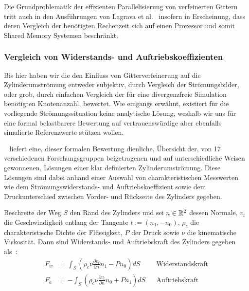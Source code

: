 \bigskip

Die Grundproblematik der effizienten Parallelisierung von verfeinerten Gittern tritt auch in den Ausführungen von Lagrava et al.~\cite[Kap.~4.1, letzter Abschnitt]{Lagrava12} insofern in Erscheinung, dass deren Vergleich der benötigten Rechenzeit sich auf einen Prozessor und somit Shared Memory Systemen beschränkt.

\newpage
\subsubsection{Vergleich von Widerstands- und Auftriebskoeffizienten}\label{kap:cylinder2dCoefficients}

Bis hier haben wir die den Einfluss von Gitterverfeinerung auf die Zylinderumströmung entweder subjektiv, durch Vergleich der Strömungsbilder, oder grob, durch einfachen Vergleich der für eine divergenzfreie Simulation benötigten Knotenanzahl, bewertet. Wie eingangs erwähnt, existiert für die vorliegende Strömungssituation keine analytische Lösung, weshalb wir uns für eine formal belastbarere Bewertung auf vertrauenswürdige aber ebenfalls simulierte Referenzwerte stützen wollen.

~\cite{SchaeferTurek96} liefert eine, dieser formalen Bewertung dienliche, Übersicht der, von 17 verschiedenen Forschungsgruppen beigetragenen und auf unterschiedliche Weisen gewonnenen, Lösungen einer klar definierten Zylinderumströmung. Diese Lösungen sind dabei anhand einer Auswahl von charakteristischen Messwerten wie dem Strömungswiderstands- und Auftriebskoeffizient sowie dem Druckunterschied zwischen Vorder- und Rückseite des Zylinders gegeben.

\begin{Definition}
	Beschreite der Weg \(S\) den Rand des Zylinders und sei \(n \in \mathbb{R}^2\) dessen Normale, \(v_t\) die Geschwindigkeit entlang der Tangente \(t:=(n_1,-n_0)\), \(\rho_c\) die charakteristische Dichte der Flüssigkeit, \(P\) der Druck sowie \(\nu\) die kinematische Viskosität. Dann sind Widerstands- und Auftriebskraft des Zylinders gegeben als~\cite[Kap.~2.2]{SchaeferTurek96}:
\begin{align*}
F_w &= \int_S \left( \rho_c \nu \frac{\partial v_t}{\partial n} n_1 - P n_0 \right) dS && \text{Widerstandskraft}\\
F_a &= - \int_S \left( \rho_c \nu \frac{\partial v_t}{\partial n} n_0 + P n_1 \right) dS && \text{Auftriebskraft}
\end{align*}
\end{Definition}

